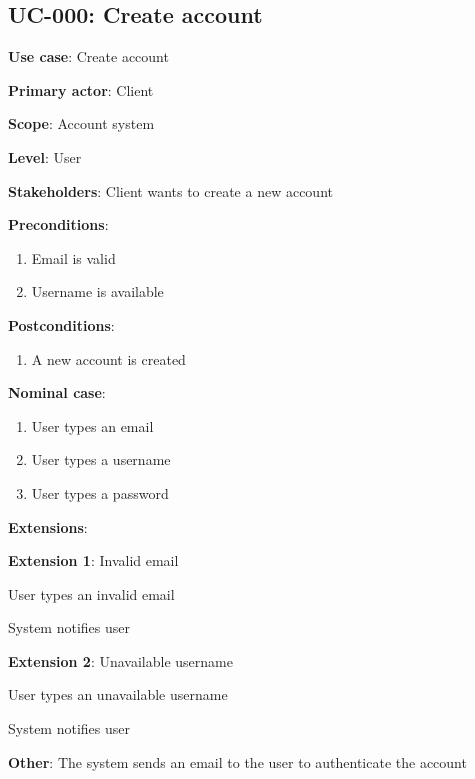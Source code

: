 \documentclass[a4paper, 11pt]{article}
\newcommand{\createsection}[1]{\noindent\textbf{#1}:}
\newcommand{\createextension}[2]{\noindent\hspace*{0.8em}\textbf{#1}: #2}
\begin{document}
\subsection{UC-000: Create account}

\createsection{Use case} Create account

\createsection{Primary actor} Client

\createsection{Scope} Account system

\createsection{Level} User

\createsection{Stakeholders} Client wants to create a new account

\createsection{Preconditions} 
\begin{enumerate}
\item Email is valid
\item Username is available
\end{enumerate}

\createsection{Postconditions} 
\begin{enumerate}
\item A new account is created
\end{enumerate}

\createsection{Nominal case} 
\begin{enumerate}
\item User types an email
\item User types a username
\item User types a password
\end{enumerate}

\createsection{Extensions} 

\vspace{1em}
\createextension{Extension 1}{Invalid email}
\begin{extension}[label=1.\arabic*]
\item User types an invalid email
\item System notifies user
\end{extension}
\createextension{Extension 2}{Unavailable username}
\begin{extension}[label=2.\arabic*]
\item User types an unavailable username
\item System notifies user
\end{extension}

\createsection{Other} The system sends an email to the user to authenticate the account
\end{document}
